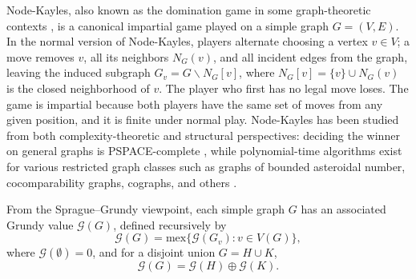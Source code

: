 \documentclass[12pt]{elsarticle}
\newtheorem*{theorem A}{Theorem A}
\newtheorem*{theorem B}{N\"olker's Theorem}
\theoremstyle{remark}
\theoremstyle{remark}
\theoremstyle{definition}
\begin{document}
Node-Kayles, also known as the domination game in some graph-theoretic contexts \cite{duchene2009combinatorial}, is a canonical impartial game played on a simple graph $G = (V,E)$. In the normal version of Node-Kayles, players alternate choosing a vertex $v \in V$; a move removes $v$, all its neighbors $N_{G}(v)$, and all incident edges from the graph, leaving the induced subgraph $G_{v} = G \backslash N_{G}[v]$, where $N_{G}[v] = \{v\} \cup N_{G}(v)$ is the closed neighborhood of $v$. The player who first has no legal move loses. The game is impartial because both players have the same set of moves from any given position, and it is finite under normal play. Node-Kayles has been studied from both complexity-theoretic and structural perspectives: deciding the winner on general graphs is PSPACE-complete \cite{bodlaender2015exact,fleischer2004kayles}, while polynomial-time algorithms exist for various restricted graph classes such as graphs of bounded asteroidal number, cocomparability graphs, cographs, and others \cite{guignard2009compound,bodlaender2002kayles}.

From the Sprague–Grundy viewpoint, each simple graph $G$ has an associated Grundy value $\mathcal{G}(G)$, defined recursively by
\begin{equation*}
	\mathcal{G}(G) = \mathrm{mex}\{\mathcal{G}(G_{v}): v \in V(G)\},
\end{equation*}
where $\mathcal{G}(\emptyset) = 0$, and for a disjoint union $G = H \cup K$,
\begin{equation*}
	\mathcal{G}(G) = \mathcal{G}(H) \oplus \mathcal{G}(K).
\end{equation*}
\end{document}
